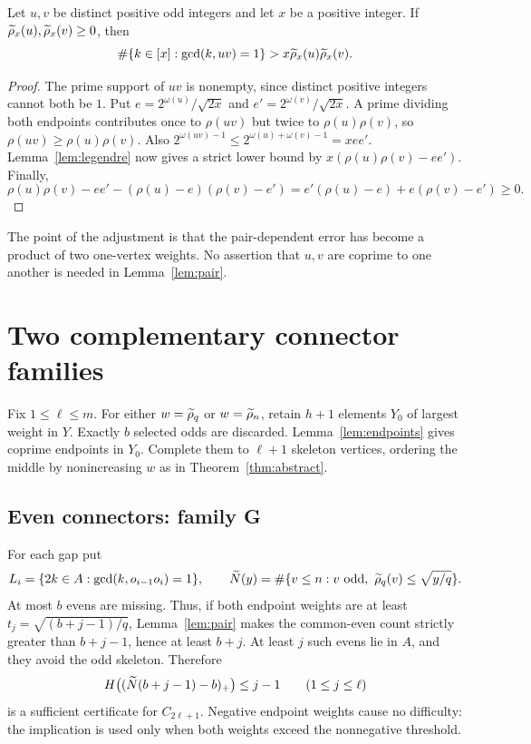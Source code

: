 \begin{lemma}\label{lem:pair}
Let $u,v$ be distinct positive odd integers and let $x$ be a positive integer. If $\widetilde\rho_x(u),\widetilde\rho_x(v)\ge0$, then
\begin{equation}\label{eq:pair}
\#\{k\in[x]:\gcd(k,uv)=1\}>x\widetilde\rho_x(u)\widetilde\rho_x(v).
\end{equation}
\end{lemma}
\begin{proof}
The prime support of $uv$ is nonempty, since distinct positive integers cannot both be $1$. Put $e=2^{\omega(u)}/\sqrt{2x}$ and $e'=2^{\omega(v)}/\sqrt{2x}$. A prime dividing both endpoints contributes once to $\rho(uv)$ but twice to $\rho(u)\rho(v)$, so $\rho(uv)\ge\rho(u)\rho(v)$. Also
$2^{\omega(uv)-1}\le2^{\omega(u)+\omega(v)-1}=xee'$.
Lemma~\ref{lem:legendre} now gives a strict lower bound by
$x(\rho(u)\rho(v)-ee')$. Finally,
\[
 \rho(u)\rho(v)-ee'-(\rho(u)-e)(\rho(v)-e')
 =e'(\rho(u)-e)+e(\rho(v)-e')\ge0.
\]
\end{proof}
The point of the adjustment is that the pair-dependent error has become a product of two one-vertex weights. No assertion that $u,v$ are coprime to one another is needed in Lemma~\ref{lem:pair}.

\section{Two complementary connector families}\label{sec:families}
Fix $1\le\ell\le m$. For either $w=\widetilde\rho_q$ or $w=\widetilde\rho_n$, retain $h+1$ elements $Y_0$ of largest weight in $Y$. Exactly $b$ selected odds are discarded. Lemma~\ref{lem:endpoints} gives coprime endpoints in $Y_0$. Complete them to $\ell+1$ skeleton vertices, ordering the middle by nonincreasing $w$ as in Theorem~\ref{thm:abstract}.

\subsection{Even connectors: family G}
For each gap put
\[
L_i=\{2k\in A:\gcd(k,o_{i-1}o_i)=1\},
\qquad
\widetilde N(y)=\#\{v\le n:v\text{ odd},\ \widetilde\rho_q(v)\le\sqrt{y/q}\}.
\]
At most $b$ evens are missing. Thus, if both endpoint weights are at least
$t_j=\sqrt{(b+j-1)/q}$, Lemma~\ref{lem:pair} makes the common-even count strictly greater than $b+j-1$, hence at least $b+j$. At least $j$ such evens lie in $A$, and they avoid the odd skeleton. Therefore
\begin{equation}\label{eq:G}
H\bigl((\widetilde N(b+j-1)-b)_+\bigr)\le j-1
\qquad(1\le j\le\ell)
\end{equation}
is a sufficient certificate for $C_{2\ell+1}$. Negative endpoint weights cause no difficulty: the implication is used only when both weights exceed the nonnegative threshold.

